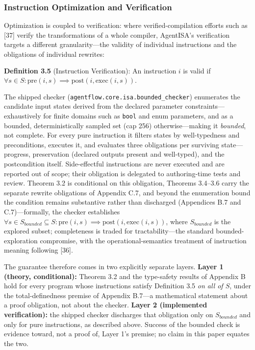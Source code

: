\documentclass[
  sigconf,
  anonymous]{acmart}
\begin{document}
\subsubsection{Instruction Optimization and
Verification}\label{instruction-optimization-and-verification}

Optimization is coupled to verification: where verified-compilation
efforts such as {[}37{]} verify the transformations of a whole compiler,
AgentISA's verification targets a different granularity---the validity
of individual instructions and the obligations of individual rewrites:

\textbf{Definition 3.5} (Instruction Verification): An instruction \(i\)
is valid if
\(\forall s \in S: \text{pre}(i,s) \implies \text{post}(i,\text{exec}(i,s))\).

The shipped checker (\texttt{agentflow.core.isa.bounded\_checker})
enumerates the candidate input states derived from the declared
parameter constraints---exhaustively for finite domains such as
\texttt{bool} and enum parameters, and as a bounded, deterministically
sampled set (cap 256) otherwise---making it \emph{bounded}, not
complete. For every pure instruction it filters states by well-typedness
and preconditions, executes it, and evaluates three obligations per
surviving state---progress, preservation (declared outputs present and
well-typed), and the postcondition itself. Side-effectful instructions
are never executed and are reported out of scope; their obligation is
delegated to authoring-time tests and review. Theorem 3.2 is conditional
on this obligation, Theorems 3.4--3.6 carry the separate rewrite
obligations of Appendix C.7, and beyond the enumeration bound the
condition remains substantive rather than discharged (Appendices B.7 and
C.7)---formally, the checker establishes
\(\forall s \in S_{bounded} \subseteq S: \text{pre}(i,s) \implies \text{post}(i,\text{exec}(i,s))\),
where \(S_{bounded}\) is the explored subset; completeness is traded for
tractability---the standard bounded-exploration compromise, with the
operational-semantics treatment of instruction meaning following
{[}36{]}.

The guarantee therefore comes in two explicitly separate layers.
\textbf{Layer 1 (theory, conditional):} Theorem 3.2 and the type-safety
results of Appendix B hold for every program whose instructions satisfy
Definition 3.5 \emph{on all of \(S\)}, under the total-definedness
premise of Appendix B.7---a mathematical statement about a proof
obligation, not about the checker. \textbf{Layer 2 (implemented
verification):} the shipped checker discharges that obligation only on
\(S_{bounded}\) and only for pure instructions, as described above.
Success of the bounded check is evidence toward, not a proof of, Layer
1's premise; no claim in this paper equates the two.
\end{document}
